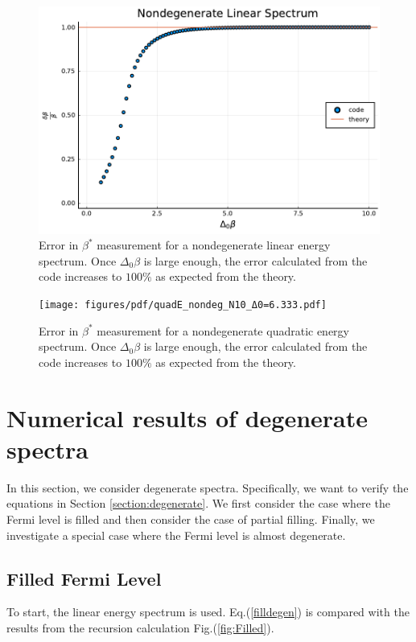\begin{figure}[H]
    \centering
    \includegraphics[scale=.75]{figures/pdf/linE_nondeg_N10.pdf}
    \caption{Error in $\beta^*$ measurement for a nondegenerate linear energy spectrum. Once $\Delta_0\beta$ is large enough, the error calculated from the code increases to $100\%$ as expected from the theory. }
    \label{fig:linnondeg}
\end{figure}

\begin{figure}[H]
    \centering
    \texttt{[image: figures/pdf/quadE\_nondeg\_N10\_Δ0=6.333.pdf]}
    \caption{Error in $\beta^*$ measurement for a nondegenerate quadratic energy spectrum. Once $\Delta_0\beta$ is large enough, the error calculated from the code increases to $100\%$ as expected from the theory. }
    \label{fig:quadnondeg}
\end{figure}


\section{Numerical results of degenerate spectra}
In this section, we consider degenerate spectra. Specifically, we want to verify the equations in Section \ref{section:degenerate}. We first consider the case where the Fermi level is filled and then consider the case of partial filling. Finally, we investigate a special case where the Fermi level is almost degenerate. 
\subsection{Filled Fermi Level}
To start, the linear energy spectrum is used. Eq.\@ (\ref{filldegen}) is compared with the results from the recursion calculation Fig.\@ (\ref{fig:Filled}).  

